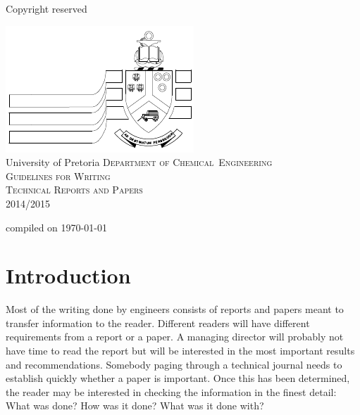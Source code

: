 \documentclass[a5paper, 10pt]{article}
\begin{document}
\begin{titlepage}
  \begin{centering}
    \begin{flushright}Copyright reserved\end{flushright}
    \vfil
    \includegraphics{uplogo}\\
    \textsf{University of Pretoria}
    \vfil
    {\Huge\scshape
    Department of Chemical~Engineering\\
    \vfil
    Guidelines for Writing \\ Technical Reports and Papers\\}
  \vfil
  2014/2015 \\
  \vfil
  \begin{flushright}\small{compiled on \today}\end{flushright}
\end{centering}

\end{titlepage}

\pagestyle{empty}

\cleardoublepage

\setcounter{page}{1}
\pagestyle{plain}
\tableofcontents
\newpage

\pagestyle{empty}
\cleardoublepage
\setcounter{page}{1}
\pagestyle{plain}

\section{Introduction}
\label{cha:introduction}
Most of the writing done by engineers consists of reports and papers
meant to transfer information to the reader.  Different readers will
have different requirements from a report or a paper.  A managing
director will probably not have time to read the report but will be
interested in the most important results and recommendations.
Somebody paging through a technical journal needs to establish quickly
whether a paper is important.  Once this has been determined, the
reader may be interested in checking the information in the finest
detail: What was done?  How was it done?  What was it done with?
\end{document}
